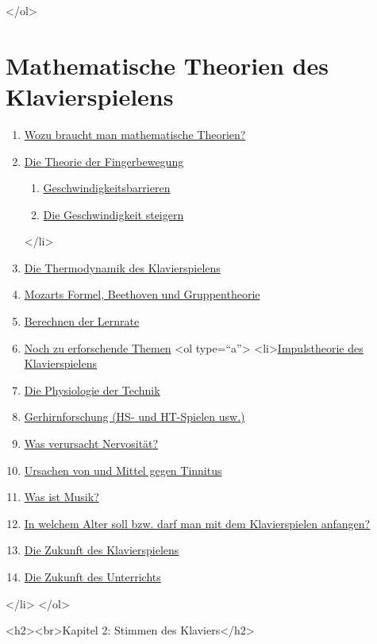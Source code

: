 </ol>

\chapter{Mathematische Theorien des Klavierspielens}

\begin{enumerate} 
 \item \hyperlink{c1iv1}{Wozu braucht man mathematische Theorien?}
 \item \hyperlink{c1iv2}{Die Theorie der Fingerbewegung}
   \begin{enumerate}[label={\alph*.}] 
    <li>\hyperlink{c1iv2a}{Serielles und paralleles Spielen}
    \item \hyperlink{c1iv2b}{Geschwindigkeitsbarrieren}
    \item \hyperlink{c1iv2c}{Die Geschwindigkeit steigern}
    \end{enumerate}
 </li>
 \item \hyperlink{c1iv3}{Die Thermodynamik des Klavierspielens}
 \item \hyperlink{c1iv4}{Mozarts Formel, Beethoven und Gruppentheorie}
 \item \hyperlink{c1iv5}{Berechnen der Lernrate}
 \item \hyperlink{c1iv6}{Noch zu erforschende Themen}
   <ol type=\enquote{a}>
    <li>\hyperlink{c1iv6a}{Impulstheorie des Klavierspielens}
    \item \hyperlink{c1iv6b}{Die Physiologie der Technik}
    \item \hyperlink{c1iv6c}{Gerhirnforschung (HS- und HT-Spielen usw.)}
    \item \hyperlink{c1iv6d}{Was verursacht Nervosität?}
    \item \hyperlink{c1iv6e}{Ursachen von und Mittel gegen Tinnitus}
    \item \hyperlink{c1iv6f}{Was ist Musik?}
    \item \hyperlink{c1iv6g}{In welchem Alter soll bzw. darf man mit dem Klavierspielen anfangen?}
    \item \hyperlink{c1iv6h}{Die Zukunft des Klavierspielens}
    \item \hyperlink{c1iv6i}{Die Zukunft des Unterrichts}
    \end{enumerate}
 </li>
</ol>

<h2><br>Kapitel 2: Stimmen des Klaviers</h2> 

